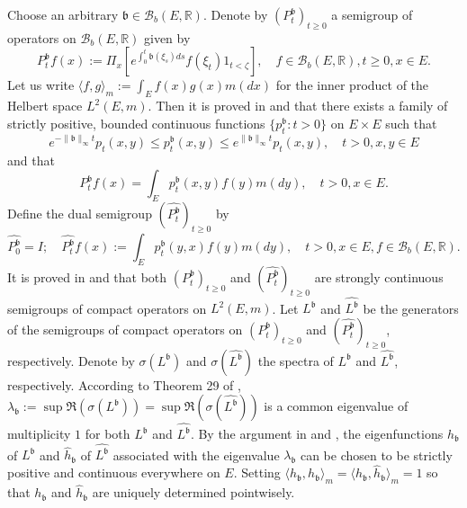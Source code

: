 \documentclass[12pt,a4paper]{amsart}
\numberwithin{equation}{section}
\theoremstyle{plain}
\theoremstyle{definition}
\theoremstyle{remark}
\begin{document}
	Choose an arbitrary $ \mathfrak b\in \mathcal B_b(E,\mathbb R)$.
	Denote by $(P_t^\mathfrak b)_{t\geq 0}$ a semigroup of operators on $\mathcal B_b(E,\mathbb R)$ given by
\begin{equation}
	P_t^\mathfrak b f(x)
	:= \Pi_x[e^{\int_0^t \mathfrak b(\xi_s)ds} f(\xi_t) 1_{t< \zeta}],
	\quad f\in \mathcal B_b(E, \mathbb R), t\geq 0, x\in E.
\end{equation}
	Let us write $\langle f,g \rangle_m:= \int_E f(x)g(x) m(dx)$ for  the inner product of the Helbert space $L^2(E,m)$.
	Then it is proved in \cite{RenSongZhang2015Limit} and \cite{RenSongZhang2017Central} that there exists a family of strictly positive, bounded continuous functions $\{p_t^\mathfrak b: t> 0\}$ on $E\times E$ such that
\begin{equation} \label{eq:IU.0}
	e^{-\|\mathfrak b\|_\infty t} p_t(x,y)
	\leq p_t^\mathfrak b(x,y) \leq e^{\|\mathfrak b\|_\infty t}p_t(x,y),
	\quad t>0, x,y\in E
\end{equation}
	and that
\begin{equation}
	P_t^\mathfrak b f(x)
	= \int_E p_t^\mathfrak b(x,y) f(y) m(dy),
	\quad t>0, x\in E.
\end{equation}
	Define the dual semigroup $(\widehat {P^{\mathfrak b}_t} )_{t\geq 0}$ by
\begin{equation}
	\widehat {P_0^{\mathfrak b}}
	= I;
	\quad \widehat {P_t^{\mathfrak b}} f(x)
	:= \int_E p_t^\mathfrak b(y,x) f(y) m(dy),
	\quad t>0,x\in E, f\in \mathcal B_b(E,\mathbb R).
\end{equation}
	It is proved in \cite{RenSongZhang2015Limit} and \cite{RenSongZhang2017Central} that both $(P_t^\mathfrak b)_{t\geq 0}$ and $(\widehat {P_t^\mathfrak b})_{t\geq 0}$ are strongly continuous semigroups of compact operators on $L^2(E,m)$.	
	Let $L^\mathfrak b$ and $\widehat {L^\mathfrak b}$ be the generators of the semigroups of compact operators on $(P_t^\mathfrak b)_{t\geq 0}$ and $(\widehat {P_t^\mathfrak b})_{t\geq 0}$, respectively.
	Denote by $\sigma(L^\mathfrak b)$ and $\sigma(\widehat{L^\mathfrak b})$ the spectra of $L^\mathfrak b$ and $\widehat {L^{\mathfrak b}}$, respectively.
	According to Theorem 29 of \cite{Schaefer1974Banach}, $\lambda_\mathfrak b:= \sup \Re(\sigma(L^\mathfrak b)) = \sup \Re(\sigma( \widehat{L^\mathfrak b})) $ is a common eigenvalue of multiplicity $1$ for both $L^\mathfrak b$ and $\widehat {L^{\mathfrak b}}$.
	By the argument in \cite{RenSongZhang2015Limit} and \cite{RenSongZhang2017Central}, the eigenfunctions $h_\mathfrak b$ of $L^\mathfrak b$ and $\widehat h_\mathfrak b$ of $\widehat{L^\mathfrak b}$ associated with the eigenvalue $\lambda_\mathfrak b$ can be chosen to be strictly positive and continuous everywhere on $E$.
	Setting $\langle h_\mathfrak b,h_\mathfrak b\rangle_m = \langle h_\mathfrak b, \widehat h_\mathfrak b\rangle_m = 1$ so that $h_\mathfrak b$ and $\widehat h_\mathfrak b$ are uniquely determined pointwisely.
\end{document}
